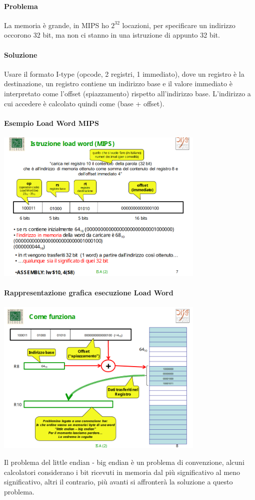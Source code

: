 \documentclass[12pt, a4paper, openany]{book}
\begin{document}
\paragraph{Problema} La memoria è grande, in MIPS ho $2^{32}$ locazioni, 
per specificare un indirizzo occorono 32 bit, ma non ci stanno in una istruzione di appunto
32 bit. 
\paragraph*{Soluzione} Usare il formato I-type (opcode, 2 registri, 1 immediato), dove un
registro è la destinazione, un registro contiene un indirizzo base e il valore immediato
è interpretato come l'offset (spiazzamento) rispetto all'indirizzo base.
L'indirizzo a cui accedere è calcolato quindi come (base + offset).
\paragraph*{Esempio Load Word MIPS}
\begin{center}
    \includegraphics[width=100mm, scale=0.5]{load and store.png}
\end{center}
\paragraph*{Rappresentazione grafica esecuzione Load Word}
\begin{center}
    \includegraphics[width=100mm, scale=0.5]{funzionamento ld.png}
\end{center}
Il problema del little endian - big endian è un problema di convenzione,
alcuni calcolatori considerano i bit ricevuti in memoria dal più significativo
al meno significativo, altri il contrario, più avanti si affronterà la soluzione
a questo problema.
\end{document}
